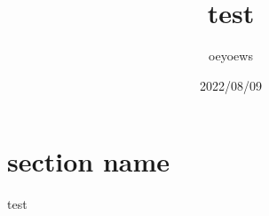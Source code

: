 \documentclass{article}
\title{test}
\author{oeyoews}
\date{2022/08/09}
\begin{document}
\maketitle


\section{section name}%
\label{sec:section name}
test
\end{document}
